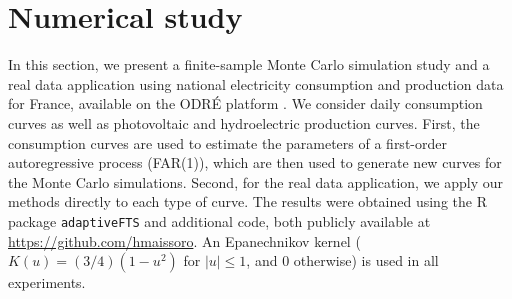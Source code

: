 \section{Numerical study}\label{sec:blup:numerical_study} 
In this section, we present a finite-sample Monte Carlo simulation study and a real data application using national electricity consumption and production data for France, available on the ODR\'E platform \citep{odre_data}. We consider daily consumption curves as well as photovoltaic and hydroelectric production curves. First, the consumption curves are used to estimate the parameters of a first-order autoregressive process (FAR(1)), which are then used to generate new curves for the Monte Carlo simulations. Second, for the real data application, we apply our methods directly to each type of curve. The results were obtained using the R package \texttt{adaptiveFTS} and additional code, both publicly available at \url{https://github.com/hmaissoro}. An Epanechnikov kernel ($K(u) = (3/4)(1-u^2)$ for $|u|\leq 1$, and $0$ otherwise) is used in all experiments.
 

